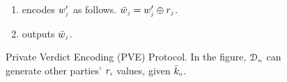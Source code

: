 \begin{figure}[!htbp]
\begin{center}
\begin{tcolorbox}[enhanced,width=81mm, height=66.5mm, left=0mm,
    drop fuzzy shadow southwest,
    colframe=black,colback=white]
{{\begin{enumerate}[leftmargin=5.2mm]
\item encodes  $w'_{\scriptscriptstyle j}$ as follows. %
%
$\bar w_{\scriptscriptstyle j}= w'_{\scriptscriptstyle j}\oplus r_{\scriptscriptstyle j}$.
%
\item outputs $\bar{ w}_{\scriptscriptstyle j}$.
%
\vspace{-1.4mm}
 \end{enumerate}
 
 
 
}}
\end{tcolorbox}
\end{center}
\vspace{-2mm}
\caption{Private Verdict Encoding  (PVE) Protocol. In the figure, $\mathcal{D}_{\scriptscriptstyle n}$ can generate other parties' $r_{\scriptscriptstyle i}$ values, given $\bar k_{\scriptscriptstyle 0}$.} 
\label{fig:PVE}
\end{figure}
%

